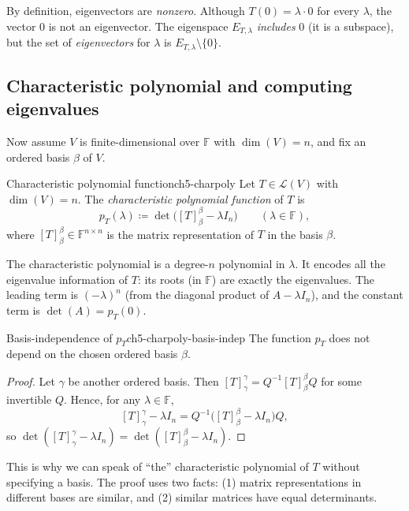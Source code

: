 \begin{commonmistake}[title={Common Mistake: the zero vector is never an eigenvector}]
By definition, eigenvectors are \emph{nonzero}.
Although $T(0)=\lambda\cdot 0$ for every $\lambda$, the vector $0$ is not an eigenvector.
The eigenspace $E_{T,\lambda}$ \emph{includes} $0$ (it is a subspace), but the set of \emph{eigenvectors} for $\lambda$ is $E_{T,\lambda}\setminus\{0\}$.
\end{commonmistake}

\subsection{Characteristic polynomial and computing eigenvalues}

Now assume $V$ is finite-dimensional over $\mathbb{F}$ with $\dim(V)=n$, and fix an ordered basis $\beta$ of $V$.

\begin{definition}{Characteristic polynomial function}{ch5-charpoly}
Let $T\in\mathcal{L}(V)$ with $\dim(V)=n$. The \emph{characteristic polynomial function} of $T$ is
\[
p_T(\lambda)\coloneqq \det\!\bigl([T]_{\beta}^{\beta}-\lambda I_n\bigr)\qquad(\lambda\in\mathbb{F}),
\]
where $[T]_{\beta}^{\beta}\in\mathbb{F}^{n\times n}$ is the matrix representation of $T$ in the basis $\beta$.
\end{definition}

The characteristic polynomial is a degree-$n$ polynomial in $\lambda$.
It encodes all the eigenvalue information of $T$: its roots (in $\mathbb{F}$) are exactly the eigenvalues.
The leading term is $(-\lambda)^n$ (from the diagonal product of $A-\lambda I_n$), and the constant term is $\det(A)=p_T(0)$.

\begin{theorem}{Basis-independence of $p_T$}{ch5-charpoly-basis-indep}
The function $p_T$ does not depend on the chosen ordered basis $\beta$.
\end{theorem}

\begin{proof}
Let $\gamma$ be another ordered basis. Then $[T]_{\gamma}^{\gamma}=Q^{-1}[T]_{\beta}^{\beta}Q$ for some invertible $Q$.
Hence, for any $\lambda\in\mathbb{F}$,
\[
[T]_{\gamma}^{\gamma}-\lambda I_n
=
Q^{-1}\bigl([T]_{\beta}^{\beta}-\lambda I_n\bigr)Q,
\]
so $\det([T]_{\gamma}^{\gamma}-\lambda I_n)=\det([T]_{\beta}^{\beta}-\lambda I_n)$.
\end{proof}

This is why we can speak of ``the'' characteristic polynomial of $T$ without specifying a basis.
The proof uses two facts: (1) matrix representations in different bases are similar, and (2) similar matrices have equal determinants.

